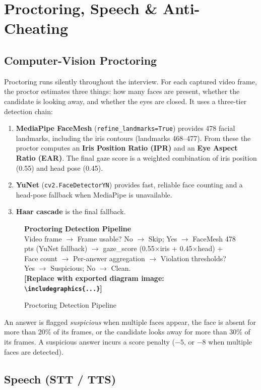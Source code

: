 \documentclass[12pt,a4paper,oneside]{report}
\newcommand{\diagramplaceholder}[1]{%
  \begin{tcolorbox}[
    colback=gray!5, colframe=gray!50,
    boxrule=0.4pt, arc=2pt,
    left=10pt, right=10pt, top=8pt, bottom=8pt,
    fontupper=\small\itshape
  ]
  \centering #1\\[4pt]
  \textbf{[Replace with exported diagram image: \texttt{\textbackslash includegraphics\{...\}}]}
  \end{tcolorbox}%
}
\begin{document}
\section{Proctoring, Speech \& Anti-Cheating}

\subsection{Computer-Vision Proctoring}

Proctoring runs silently throughout the interview. For each captured video frame, the proctor
estimates three things: how many faces are present, whether the candidate is looking away, and
whether the eyes are closed. It uses a three-tier detection chain:

\begin{enumerate}
  \item \textbf{MediaPipe FaceMesh} (\texttt{refine\_landmarks=True}) provides 478 facial
    landmarks, including the iris contours (landmarks 468--477). From these the proctor
    computes an \textbf{Iris Position Ratio (IPR)} and an \textbf{Eye Aspect Ratio (EAR)}.
    The final gaze score is a weighted combination of iris position (0.55) and head pose (0.45).
  \item \textbf{YuNet} (\texttt{cv2.FaceDetectorYN}) provides fast, reliable face counting
    and a head-pose fallback when MediaPipe is unavailable.
  \item \textbf{Haar cascade} is the final fallback.
\end{enumerate}

\begin{figure}[H]
\centering
\diagramplaceholder{%
  \textbf{Proctoring Detection Pipeline}\\
  Video frame $\to$ Frame usable? No $\to$ Skip; Yes $\to$ FaceMesh 478 pts (YuNet fallback) $\to$
  gaze\_score (0.55$\times$iris + 0.45$\times$head) + Face count $\to$ Per-answer aggregation $\to$
  Violation thresholds? Yes $\to$ Suspicious; No $\to$ Clean.%
}
\caption{Proctoring Detection Pipeline}
\label{fig:proctor}
\end{figure}

An answer is flagged \textit{suspicious} when multiple faces appear, the face is absent for
more than 20\% of its frames, or the candidate looks away for more than 30\% of its frames.
A suspicious answer incurs a score penalty ($-5$, or $-8$ when multiple faces are detected).

\subsection{Speech (STT / TTS)}
\end{document}
